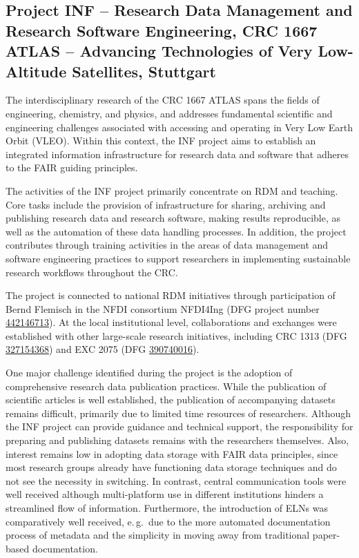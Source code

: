 \documentclass{eceasst}
\newcommand{\geprislink}[1]{\href{https://gepris.dfg.de/gepris/projekt/#1?language=en}{#1}}
\newcommand{\eg}{e.\,g.}
\begin{document}
\subsection{Project INF -- Research Data Management and Research Software Engineering, CRC 1667 ATLAS -- Advancing Technologies of Very Low-Altitude Satellites, Stuttgart}
The interdisciplinary research of the CRC 1667 ATLAS spans the fields of engineering, chemistry, and physics, and addresses fundamental scientific and engineering challenges associated with accessing and operating in Very Low Earth Orbit (VLEO).
Within this context, the INF project aims to establish an integrated information infrastructure for research data and software that adheres to the FAIR guiding principles.

The activities of the INF project primarily concentrate on RDM and teaching.
Core tasks include the provision of infrastructure for sharing, archiving and publishing research data and research software, making results reproducible, as well as the automation of these data handling processes.
In addition, the project contributes through training activities in the areas of data management and software engineering practices to support researchers in implementing sustainable research workflows throughout the CRC.

The project is connected to national RDM initiatives through participation of Bernd Flemisch in the NFDI consortium NFDI4Ing (DFG project number \geprislink{442146713}).
At the local institutional level, collaborations and exchanges were established with other large-scale research initiatives, including CRC 1313 (DFG \geprislink{327154368}) and EXC 2075 (DFG \geprislink{390740016}).

One major challenge identified during the project is the adoption of comprehensive research data publication practices.
While the publication of scientific articles is well established, the publication of accompanying datasets remains difficult, primarily due to limited time resources of researchers.
Although the INF project can provide guidance and technical support, the responsibility for preparing and publishing datasets remains with the researchers themselves.
Also, interest remains low in adopting data storage with FAIR data principles, since most research groups already have functioning data storage techniques and do not see the necessity in switching.
In contrast, central communication tools were well received although multi-platform use in different institutions hinders a streamlined flow of information.
Furthermore, the introduction of ELNs was comparatively well received, \eg~due to the more automated documentation process of metadata and the simplicity in moving away from traditional paper-based documentation.
\end{document}
